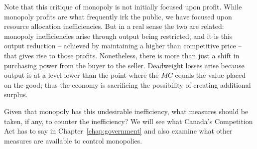 Note that this critique of monopoly is not initially focused upon profit. While monopoly profits are what frequently irk the public, we have focused upon resource allocation inefficiencies. But in a real sense the two are related: monopoly inefficiencies arise through output being restricted, and it is this output reduction -- achieved by maintaining a higher than competitive price -- that gives rise to those profits. Nonetheless, there is more than just a shift in purchasing power from the buyer to the seller. Deadweight losses arise because output is at a level lower than the point where the $MC$ equals the value placed on the good; thus the economy is sacrificing the possibility of creating additional surplus.

Given that monopoly has this undesirable inefficiency, what measures should be taken, if any, to counter the inefficiency? We will see what Canada's Competition Act has to say in Chapter~\ref{chap:government} and also examine what other measures are available to control monopolies.